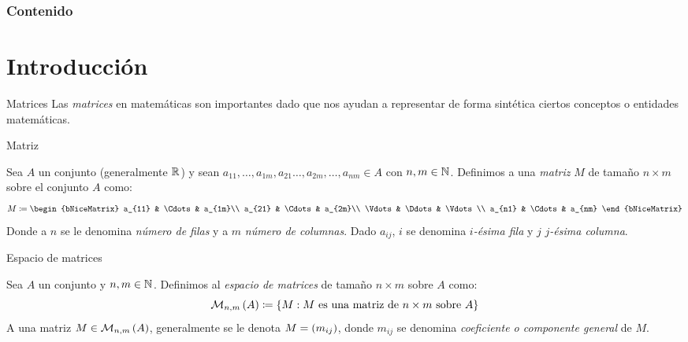 

    \frame{\titlepage}
	\begin{frame}
		\frametitle{Contenido}
		\tableofcontents
	\end{frame}
    \section{Introducción}
    \begin{frame}{Matrices}
        Las \emph{matrices} en matemáticas son importantes dado que nos ayudan a representar de forma sintética ciertos conceptos o entidades matemáticas. 
    \end{frame}
    \begin{frame}{Matriz}
        \begin{mdefinition}[Matriz]
            Sea $A$ un conjunto (generalmente $ \rmath $) y sean $ a_{11},\dotsc, a_{1m}, a_{21}\dotsc, a_{2m},\dotsc, a_{nm}\in A $ con $ n, m\in\nmath $. Definimos a una \emph{matriz} $ M $ de tamaño $ n\times m $ sobre el conjunto $ A $ como:
            \[ M\coloneqq 
	            \begin{bNiceMatrix}
		            a_{11} & \Cdots & a_{1m}\\
		            a_{21} & \Cdots & a_{2m}\\
		            \Vdots & \Ddots & \Vdots\\
		            a_{n1} & \Cdots & a_{nm}
	            \end{bNiceMatrix}
            \]
            Donde a $n$ se le denomina \emph{número de filas} y a $m$ \emph{número de columnas}. Dado $a_{ij}$, $i$ se denomina \emph{$i$-ésima fila} y $j$ \emph{$j$-ésima columna}.
        \end{mdefinition}
    \end{frame}
    \begin{frame}{Espacio de matrices}
        \begin{mdefinition}
            Sea $A$ un conjunto y $n, m\in\nmath$. Definimos al \emph{espacio de matrices} de tamaño $n\times m$ sobre $A$ como:
            \[\mmatrix{A}{n, m}\coloneqq\set{M: M\text{ es una matriz de $n\times m$ sobre }A}\]
            A una matriz $M\in\mmatrix{A}{n,m}$, generalmente se le denota $M =\pa{m_{ij}}$, donde $m_{ij}$ se denomina \emph{coeficiente o componente general} de $M$.
        \end{mdefinition}
    \end{frame}
